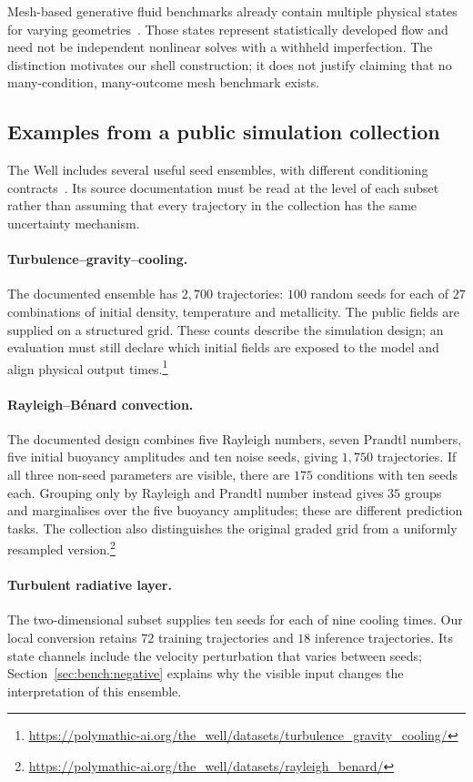 Mesh-based generative fluid benchmarks already contain multiple physical
states for varying geometries~\cite{lino2025diffusiongraphnets,
lino2026scaleautoregressive}. Those states represent statistically developed
flow and need not be independent nonlinear solves with a withheld imperfection.
The distinction motivates our shell construction; it does not justify claiming
that no many-condition, many-outcome mesh benchmark exists.

\subsection{Examples from a public simulation collection}
\label{sec:bench:tier1}

The Well includes several useful seed ensembles, with different conditioning
contracts~\cite{ohana2024well}. Its source documentation must be read at the
level of each subset rather than assuming that every trajectory in the
collection has the same uncertainty mechanism.

\paragraph{Turbulence--gravity--cooling.}
The documented ensemble has $2{,}700$ trajectories: $100$ random seeds for
each of $27$ combinations of initial density, temperature and metallicity.
The public fields are supplied on a structured grid. These counts
describe the simulation design; an evaluation must still declare which initial
fields are exposed to the model and align physical output
times.\footnote{\url{https://polymathic-ai.org/the_well/datasets/turbulence_gravity_cooling/}}

\paragraph{Rayleigh--B\'enard convection.}
The documented design combines five Rayleigh numbers, seven Prandtl numbers,
five initial buoyancy amplitudes and ten noise seeds, giving $1{,}750$
trajectories. If all three non-seed parameters are visible, there are $175$
conditions with ten seeds each. Grouping only by Rayleigh and Prandtl number
instead gives $35$ groups and marginalises over the five buoyancy amplitudes;
these are different prediction tasks. The collection also distinguishes the
original graded grid from a uniformly resampled
version.\footnote{\url{https://polymathic-ai.org/the_well/datasets/rayleigh_benard/}}

\paragraph{Turbulent radiative layer.}
The two-dimensional subset supplies ten seeds for each of nine cooling times.
Our local conversion retains $72$ training trajectories and $18$ inference
trajectories. Its state channels include the velocity perturbation that varies
between seeds; Section~\ref{sec:bench:negative} explains why the visible input
changes the interpretation of this ensemble.

